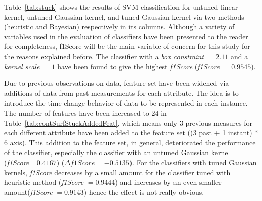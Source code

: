 


Table~\ref{tab:stuck} shows the results of SVM classification for untuned linear kernel, untuned Gaussian kernel, and tuned Gaussian kernel via two methods (heuristic and Bayesian) respectively in its columns.  
Although a variety of variables used in the evaluation of classifiers have been presented to the reader for completeness, f1Score will be the main variable of concern for this study for the reasons explained before. 
The classifier with a \emph{box constraint} $= 2.11$ and a \emph{kernel scale} $ = 1$ have been found to give the highest \emph{f1Score} (\emph{f1Score} $= 0.9545$). 

Due to previous observations on data, feature set have been widened via additions of data from past measurements for each attribute. 
The idea is to introduce the time change behavior of data to be represented in each instance. 
The number of features have been increased to 24 in Table~\ref{tab:contSurfStuckAddedFeat}, which means only 3 previous measures for each different attribute have been added to the feature set ((3 past + 1 instant) * 6 axis).
This addition to the feature set, in general, deteriorated the performance of the classifier, especially the classifier with an untuned Gaussian kernel (\emph{f1Score}= $0.4167$) ($\Delta f1Score = -0.5135$). 
For the classifiers with tuned Gaussian kernels, \emph{f1Score} decreases by a small amount for the classifier tuned with heuristic method (\emph{f1Score} $= 0.9444$) and increases by an even smaller amount(\emph{f1Score} $= 0.9143$) hence the effect is not really obvious. 



